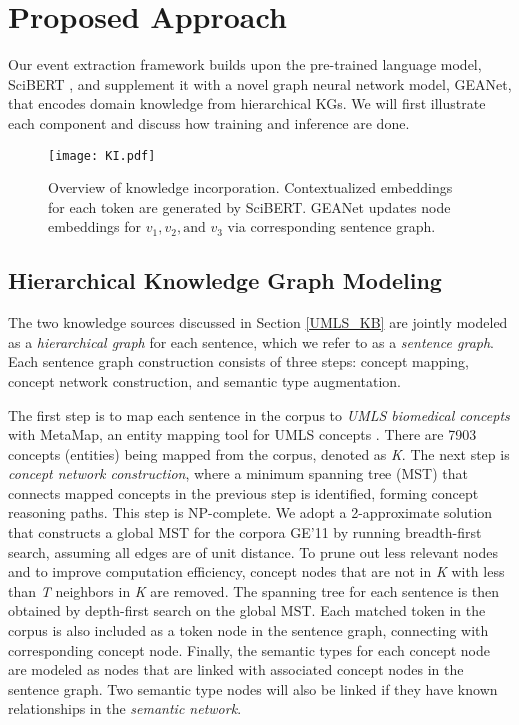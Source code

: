 \documentclass[11pt,a4paper]{article}
\newcommand{\GAENet}{\textrm{GEANet}}
\newcommand{\GE}{\textrm{{\fontfamily{qcr}\selectfont GE'11} }}
\begin{document}
 \section{Proposed Approach}




Our event extraction framework builds upon the pre-trained language model, SciBERT \cite{beltagy-etal-2019-scibert}, and supplement it with a novel graph neural network model, \GAENet{}, that encodes domain knowledge from hierarchical KGs. We will first illustrate each component and discuss how training and inference are done.  

\begin{figure}
  \centering
  \texttt{[image: KI.pdf]}
  \caption{Overview of knowledge incorporation. Contextualized embeddings for each token are generated by SciBERT. \GAENet{} updates node embeddings for $v_{1}, v_{2}, \textrm{and } v_{3}$ via corresponding sentence graph.}
  \label{KI_figure}
\vspace{-1em}
\end{figure}



\subsection{Hierarchical Knowledge Graph Modeling}
\label{sec:hierarchical_kg}
The two knowledge sources discussed in Section \ref{UMLS_KB} are jointly modeled as a \textit{hierarchical graph} for each sentence, which we refer to as a \textit{sentence graph}. Each sentence graph construction consists of three steps: concept mapping, concept network construction, and semantic type augmentation.

The first step is to map each sentence in the corpus to \textit{UMLS biomedical concepts} with MetaMap, an entity mapping tool for UMLS concepts \cite{aronson2001effective}. 
There are 7903 concepts (entities) being mapped from the corpus, denoted as \textit{K}. 
The next step is \textit{concept network construction}, where a minimum spanning tree (MST) that connects mapped concepts in the previous step is identified, forming concept reasoning paths. This step is NP-complete.\footnotemark{} We adopt a 2-approximate solution that constructs a global MST for the corpora \GE{} by running breadth-first search, assuming all edges are of unit distance. To prune out less relevant nodes and to improve computation efficiency, concept nodes that are not in \textit{K} with less than \textit{T} neighbors in \textit{K} are removed.\footnotemark
{}
The spanning tree for each sentence is then obtained by depth-first search on the global MST.
Each matched token in the corpus is also included as a token node in the sentence graph, connecting with corresponding concept node. Finally, the semantic types for each concept node are modeled as nodes that are linked with associated concept nodes in the sentence graph. Two semantic type nodes will also be linked if they have known relationships in the \textit{semantic network}. 
\end{document}

